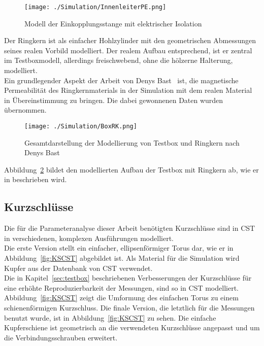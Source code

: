             \begin{figure}[htb]
                \centering
                \texttt{[image: ./Simulation/InnenleiterPE.png]}
                \caption{Modell der Einkopplungsstange mit elektrischer Isolation}
                \label{fig:InnenleiterCST}
            \end{figure}
        
        Der Ringkern ist als einfacher Hohlzylinder mit den geometrischen Abmessungen seines realen Vorbild modelliert. Der realem Aufbau entsprechend, ist er zentral im Testboxmodell, allerdings freischwebend, ohne die hölzerne Halterung, modelliert.\\
        Ein grundlegender Aspekt der Arbeit von Denys Bast~\cite{bast2017ba} ist, die magnetische Permeabilität des Ringkernmaterials in der Simulation mit dem realen Material in Übereinstimmung zu bringen. Die dabei gewonnenen Daten wurden übernommen.
        
            \begin{figure}[htb]
                \centering
                \texttt{[image: ./Simulation/BoxRK.png]}
                \caption{Gesamtdarstellung der Modellierung von Testbox und Ringkern nach Denys Bast~\cite{bast2017ba}}
                \label{fig:BoxRKCST}
            \end{figure}
        
        Abbildung~\ref{fig:BoxRKCST} bildet den modellierten Aufbau der Testbox mit Ringkern ab, wie er in \cite{bast2017ba} beschrieben wird.

        \subsection{Kurzschlüsse}
        Die für die Parameteranalyse dieser Arbeit benötigten Kurzschlüsse sind in CST in verschiedenen, komplexen Ausführungen modelliert.\\
        Die erste Version stellt ein einfacher, ellipsenförmiger Torus dar, wie er in Abbildung~\ref{fig:KSCST} abgebildet ist. Als Material für die Simulation wird Kupfer aus der Datenbank von CST verwendet.\\
        Die in Kapitel~\ref{sec:testbox} beschriebenen Verbesserungen der Kurzschlüsse für eine erhöhte Reproduzierbarkeit der Messungen, sind so in CST modelliert. Abbildung~\ref{fig:KSCST} zeigt die Umformung des einfachen Torus zu einem schienenförmigen Kurzschluss. Die finale Version, die letztlich für die Messungen benutzt wurde, ist in Abbildung~\ref{fig:KSCST} zu sehen. Die einfache Kupferschiene ist geometrisch an die verwendeten Kurzschlüsse angepasst und um die Verbindungsschrauben erweitert.
        
